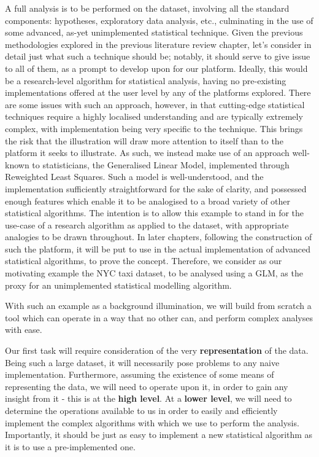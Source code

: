 A full analysis is to be performed on the dataset, involving all the
standard components: hypotheses, exploratory data analysis, etc.,
culminating in the use of some advanced, as-yet unimplemented
statistical technique. Given the previous methodologies explored in the
previous literature review chapter, let's consider in detail just what
such a technique should be; notably, it should serve to give issue to
all of them, as a prompt to develop upon for our platform. Ideally, this
would be a research-level algorithm for statistical analysis, having no
pre-existing implementations offered at the user level by any of the
platforms explored. There are some issues with such an approach,
however, in that cutting-edge statistical techniques require a highly
localised understanding and are typically extremely complex, with
implementation being very specific to the technique. This brings the
risk that the illustration will draw more attention to itself than to
the platform it seeks to illustrate. As such, we instead make use of an
approach well-known to statisticians, the Generalised Linear Model,
implemented through Reweighted Least Squares. Such a model is
well-understood, and the implementation sufficiently straightforward for
the sake of clarity, and possessed enough features which enable it to be
analogised to a broad variety of other statistical algorithms. The
intention is to allow this example to stand in for the use-case of a
research algorithm as applied to the dataset, with appropriate analogies
to be drawn throughout. In later chapters, following the construction of
such the platform, it will be put to use in the actual implementation of
advanced statistical algorithms, to prove the concept. Therefore, we
consider as our motivating example the NYC taxi dataset, to be analysed
using a GLM, as the proxy for an unimplemented statistical modelling
algorithm.

With such an example as a background illumination, we will build from
scratch a tool which can operate in a way that no other can, and perform
complex analyses with ease.

Our first task will require consideration of the very
\textbf{representation} of the data. Being such a large dataset, it will
necessarily pose problems to any naive implementation. Furthermore,
assuming the existence of some means of representing the data, we will
need to operate upon it, in order to gain any insight from it - this is
at the \textbf{high level}. At a \textbf{lower level}, we will need to
determine the operations available to us in order to easily and
efficiently implement the complex algorithms with which we use to
perform the analysis. Importantly, it should be just as easy to
implement a new statistical algorithm as it is to use a pre-implemented
one.

